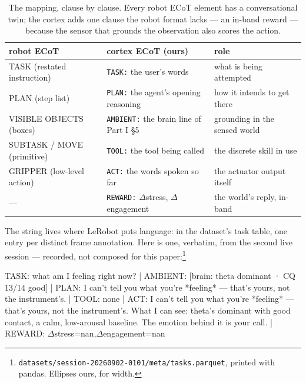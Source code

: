 \documentclass{article}
\begin{document}
\begin{table}[h]
\centering
\small
\begin{tabular}{@{}lll@{}}
\toprule
\textbf{robot ECoT}~\cite{zawalski2024ecot} & \textbf{cortex ECoT (ours)} & \textbf{role} \\
\midrule
TASK (restated instruction) & \texttt{TASK:} the user's words & what is being attempted \\
PLAN (step list) & \texttt{PLAN:} the agent's opening reasoning & how it intends to get there \\
VISIBLE OBJECTS (boxes) & \texttt{AMBIENT:} the brain line of Part I \S5 & grounding in the sensed world \\
SUBTASK / MOVE (primitive) & \texttt{TOOL:} the tool being called & the discrete skill in use \\
GRIPPER (low-level action) & \texttt{ACT:} the words spoken so far & the actuator output itself \\
--- & \texttt{REWARD:} $\Delta$stress, $\Delta$engagement & the world's reply, in-band \\
\bottomrule
\end{tabular}
\caption{The mapping, clause by clause. Every robot ECoT element has a conversational twin; the cortex adds one clause the robot format lacks --- an in-band reward --- because the sensor that grounds the observation also scores the action.}
\label{tab:ecot}
\end{table}

The string lives where LeRobot puts language: in the dataset's task table, one entry per distinct frame annotation. Here is one, verbatim, from the second live session --- recorded, not composed for this paper:\footnote{\texttt{datasets/session-20260902-0101/meta/tasks.parquet}, printed with pandas. Ellipses ours, for width.}

\begin{center}
\small
\colorbox{ink!4}{\parbox{0.94\linewidth}{\ttfamily\footnotesize
TASK: what am I feeling right now? | AMBIENT: [brain: theta dominant · CQ 13/14 good] | PLAN: I can't tell you what you're *feeling* --- that's yours, not the instrument's. | TOOL: none | ACT: I can't tell you what you're *feeling* --- that's yours, not the instrument's. What I can see: theta's dominant with good contact, a calm, low-arousal baseline. The emotion behind it is your call. | REWARD: $\Delta$stress=nan,$\Delta$engagement=nan}}
\end{center}
\end{document}
